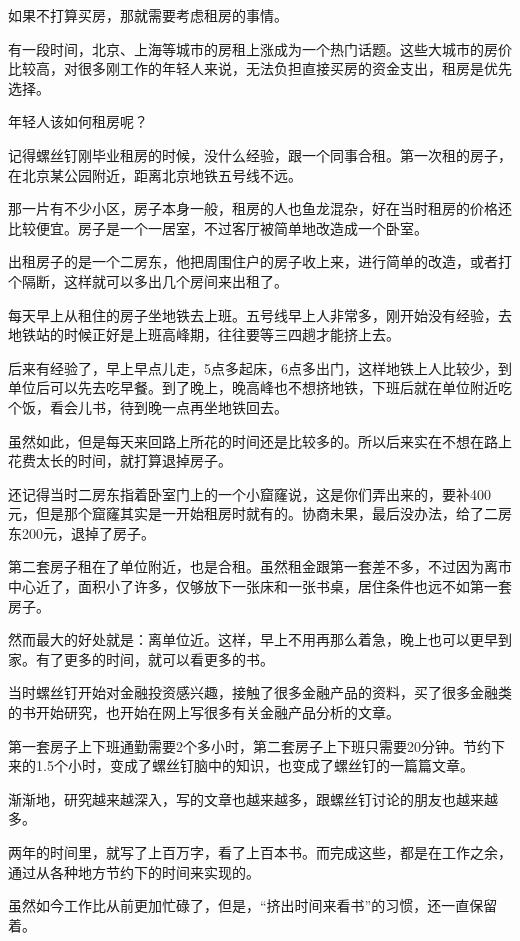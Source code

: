 如果不打算买房，那就需要考虑租房的事情。

有一段时间，北京、上海等城市的房租上涨成为一个热门话题。这些大城市的房价比较高，对很多刚工作的年轻人来说，无法负担直接买房的资金支出，租房是优先选择。

年轻人该如何租房呢？

记得螺丝钉刚毕业租房的时候，没什么经验，跟一个同事合租。第一次租的房子，在北京某公园附近，距离北京地铁五号线不远。

那一片有不少小区，房子本身一般，租房的人也鱼龙混杂，好在当时租房的价格还比较便宜。房子是一个一居室，不过客厅被简单地改造成一个卧室。

出租房子的是一个二房东，他把周围住户的房子收上来，进行简单的改造，或者打个隔断，这样就可以多出几个房间来出租了。

每天早上从租住的房子坐地铁去上班。五号线早上人非常多，刚开始没有经验，去地铁站的时候正好是上班高峰期，往往要等三四趟才能挤上去。

后来有经验了，早上早点儿走，5点多起床，6点多出门，这样地铁上人比较少，到单位后可以先去吃早餐。到了晚上，晚高峰也不想挤地铁，下班后就在单位附近吃个饭，看会儿书，待到晚一点再坐地铁回去。

虽然如此，但是每天来回路上所花的时间还是比较多的。所以后来实在不想在路上花费太长的时间，就打算退掉房子。

还记得当时二房东指着卧室门上的一个小窟窿说，这是你们弄出来的，要补400元，但是那个窟窿其实是一开始租房时就有的。协商未果，最后没办法，给了二房东200元，退掉了房子。

第二套房子租在了单位附近，也是合租。虽然租金跟第一套差不多，不过因为离市中心近了，面积小了许多，仅够放下一张床和一张书桌，居住条件也远不如第一套房子。

然而最大的好处就是：离单位近。这样，早上不用再那么着急，晚上也可以更早到家。有了更多的时间，就可以看更多的书。

当时螺丝钉开始对金融投资感兴趣，接触了很多金融产品的资料，买了很多金融类的书开始研究，也开始在网上写很多有关金融产品分析的文章。

第一套房子上下班通勤需要2个多小时，第二套房子上下班只需要20分钟。节约下来的1.5个小时，变成了螺丝钉脑中的知识，也变成了螺丝钉的一篇篇文章。

渐渐地，研究越来越深入，写的文章也越来越多，跟螺丝钉讨论的朋友也越来越多。

两年的时间里，就写了上百万字，看了上百本书。而完成这些，都是在工作之余，通过从各种地方节约下的时间来实现的。

虽然如今工作比从前更加忙碌了，但是，“挤出时间来看书”的习惯，还一直保留着。

